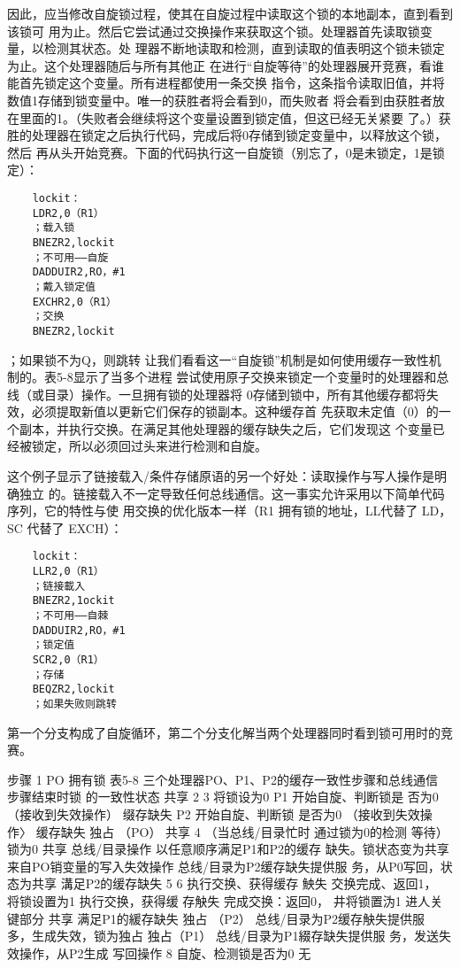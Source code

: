 因此，应当修改自旋锁过程，使其在自旋过程中读取这个锁的本地副本，直到看到该锁可
用为止。然后它尝试通过交换操作来获取这个锁。处理器首先读取锁变量，以检测其状态。处
理器不断地读取和检测，直到读取的值表明这个锁未锁定为止。这个处理器随后与所有其他正
在进行“自旋等待”的处理器展开竞赛，看谁能首先锁定这个变量。所有进程都使用一条交换
指令，这条指令读取旧值，并将数值1存储到锁变量中。唯一的获胜者将会看到0，而失败者
将会看到由获胜者放在里面的1。（失败者会继续将这个变量设置到锁定值，但这已经无关紧要
了。）获胜的处理器在锁定之后执行代码，完成后将0存储到锁定变量中，以释放这个锁，然后
再从头开始竞赛。下面的代码执行这一自旋锁（别忘了，0是未锁定，1是锁定）：
\begin{verbatim}
    lockit：
    LDR2,0（R1）
    ；载入锁
    BNEZR2,lockit
    ；不可用——自旋
    DADDUIR2,RO，#1
    ；戴入锁定值
    EXCHR2,0（R1）
    ；交换
    BNEZR2,lockit
\end{verbatim}
；如果锁不为Q，则跳转
让我们看看这一“自旋锁”机制是如何使用缓存一致性机制的。表5-8显示了当多个进程
尝试使用原子交换来锁定一个变量时的处理器和总线（或目录）操作。一旦拥有锁的处理器将
0存储到锁中，所有其他缓存都将失效，必须提取新值以更新它们保存的锁副本。这种缓存首
先获取未定值（0）的一个副本，并执行交换。在满足其他处理器的缓存缺失之后，它们发现这
个变量已经被锁定，所以必须回过头来进行检测和自旋。

这个例子显示了链接载入/条件存储原语的另一个好处：读取操作与写人操作是明确独立
的。链接载入不一定导致任何总线通信。这一事实允许采用以下简单代码序列，它的特性与使
用交换的优化版本一样（R1 拥有锁的地址，LL代替了 LD，SC 代替了 EXCH）：
\begin{verbatim}
    lockit：
    LLR2,0（R1）
    ；链接載入
    BNEZR2,1ockit
    ；不可用——自棘
    DADDUIR2,RO，#1
    ；锁定值
    SCR2,0（R1）
    ；存储
    BEQZR2,lockit
    ；如果失败则跳转
\end{verbatim}
第一个分支构成了自旋循环，第二个分支化解当两个处理器同时看到锁可用时的竞赛。

步骤
1
PO
拥有锁
表5-8 三个处理器PO、P1、P2的缓存一致性步骤和总线通信
步骤结束时锁
的一致性状态
共享
2
3
将锁设为0
P1
开始自旋、判断锁是
否为0
（接收到失效操作）
缀存缺失
P2
开始自旋、判断锁
是否为0
（接收到失效操作〉
缓存缺失
独占 （PO）
共享
4
（当总线/目录忙时
通过锁为0的检测
等待）
锁为0
共享
总线/目录操作
以任意顺序满足P1和P2的缓存
缺失。锁状态变为共享
来自PO销变量的写入失效操作
总线/目录为P2缓存缺失提供服
务，从P0写回，状态为共享
溝足P2的缓存缺失
5
6
执行交换、获得缓存
䱀失
交换完成、返回1，
将锁设置为1
执行交换，获得缓
存觖失
完成交换：返回0，
井将锁置沩1
进人关键部分
共享
满足P1的緩存缺失
独占 （P2）
总线/目录为P2缓存觖失提供服
多，生成失效，锁为独占
独占（P1）
总线/目录为P1綴存缺失提供服
务，发送失效操作，从P2生成
写回操作
8
自旋、检测锁是否为0
无

